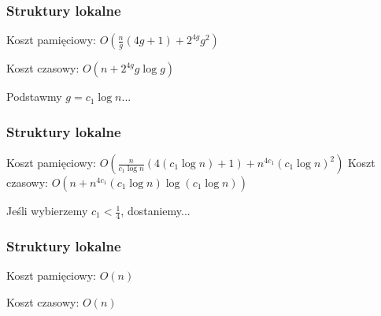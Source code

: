 \documentclass{beamer}
\begin{document}
\begin{frame} \frametitle{Struktury lokalne}
 Koszt pamięciowy: $O(\frac{n}{g} (4g + 1) + 2^{4g} g^2)$
 
 Koszt czasowy: $O(n + 2^{4g} g \log g)$
 
 Podstawmy $g=c_1 \log n$...
\end{frame}

\begin{frame} \frametitle{Struktury lokalne}
 Koszt pamięciowy: $O(\frac{n}{c_1 \log n} (4(c_1 \log n) + 1) + n^{4 c_1} (c_1 \log n)^2)$
 Koszt czasowy: $O(n + n^{4 c_1} (c_1 \log n) \log (c_1 \log n))$
 
 Jeśli wybierzemy $c_1 < \frac{1}{4}$, dostaniemy...
\end{frame}

\begin{frame} \frametitle{Struktury lokalne}
 Koszt pamięciowy: $O(n)$
 
 Koszt czasowy: $O(n)$
\end{frame}
\end{document}
